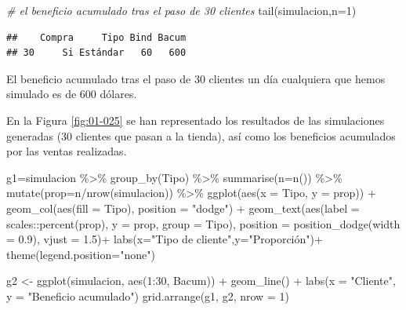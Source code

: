 \documentclass[
]{book}
\newenvironment{Shaded}{\begin{snugshade}}{\end{snugshade}}
\newcommand{\AttributeTok}[1]{\textcolor[rgb]{0.77,0.63,0.00}{#1}}
\newcommand{\CommentTok}[1]{\textcolor[rgb]{0.56,0.35,0.01}{\textit{#1}}}
\newcommand{\DecValTok}[1]{\textcolor[rgb]{0.00,0.00,0.81}{#1}}
\newcommand{\FloatTok}[1]{\textcolor[rgb]{0.00,0.00,0.81}{#1}}
\newcommand{\FunctionTok}[1]{\textcolor[rgb]{0.00,0.00,0.00}{#1}}
\newcommand{\NormalTok}[1]{#1}
\newcommand{\OtherTok}[1]{\textcolor[rgb]{0.56,0.35,0.01}{#1}}
\newcommand{\SpecialCharTok}[1]{\textcolor[rgb]{0.00,0.00,0.00}{#1}}
\newcommand{\StringTok}[1]{\textcolor[rgb]{0.31,0.60,0.02}{#1}}
\theoremstyle{definition}
\theoremstyle{definition}
\theoremstyle{definition}
\theoremstyle{definition}
\theoremstyle{remark}
\begin{document}
\begin{Shaded}
\begin{Highlighting}[]
\CommentTok{\# el beneficio acumulado tras el paso de 30 clientes}
\FunctionTok{tail}\NormalTok{(simulacion,}\AttributeTok{n=}\DecValTok{1}\NormalTok{)}
\end{Highlighting}
\end{Shaded}

\begin{verbatim}
##    Compra     Tipo Bind Bacum
## 30     Si Estándar   60   600
\end{verbatim}

El beneficio acumulado tras el paso de 30 clientes un día cualquiera que hemos simulado es de 600 dólares.

En la Figura \ref{fig:01-025} se han representado los resultados de las simulaciones generadas (30 clientes que pasan a la tienda), así como los beneficios acumulados por las ventas realizadas.

\begin{Shaded}
\begin{Highlighting}[]
\NormalTok{g1}\OtherTok{=}\NormalTok{simulacion }\SpecialCharTok{\%\textgreater{}\%}
  \FunctionTok{group\_by}\NormalTok{(Tipo) }\SpecialCharTok{\%\textgreater{}\%}
  \FunctionTok{summarise}\NormalTok{(}\AttributeTok{n=}\FunctionTok{n}\NormalTok{()) }\SpecialCharTok{\%\textgreater{}\%}
  \FunctionTok{mutate}\NormalTok{(}\AttributeTok{prop=}\NormalTok{n}\SpecialCharTok{/}\FunctionTok{nrow}\NormalTok{(simulacion)) }\SpecialCharTok{\%\textgreater{}\%}
  \FunctionTok{ggplot}\NormalTok{(}\FunctionTok{aes}\NormalTok{(}\AttributeTok{x =}\NormalTok{ Tipo, }\AttributeTok{y =}\NormalTok{ prop)) }\SpecialCharTok{+}
    \FunctionTok{geom\_col}\NormalTok{(}\FunctionTok{aes}\NormalTok{(}\AttributeTok{fill =}\NormalTok{ Tipo), }\AttributeTok{position =} \StringTok{"dodge"}\NormalTok{) }\SpecialCharTok{+}
    \FunctionTok{geom\_text}\NormalTok{(}\FunctionTok{aes}\NormalTok{(}\AttributeTok{label =}\NormalTok{ scales}\SpecialCharTok{::}\FunctionTok{percent}\NormalTok{(prop), }
                  \AttributeTok{y =}\NormalTok{ prop, }\AttributeTok{group =}\NormalTok{ Tipo),}
              \AttributeTok{position =} \FunctionTok{position\_dodge}\NormalTok{(}\AttributeTok{width =} \FloatTok{0.9}\NormalTok{),}
              \AttributeTok{vjust =} \FloatTok{1.5}\NormalTok{)}\SpecialCharTok{+}
  \FunctionTok{labs}\NormalTok{(}\AttributeTok{x=}\StringTok{"Tipo de cliente"}\NormalTok{,}\AttributeTok{y=}\StringTok{"Proporción"}\NormalTok{)}\SpecialCharTok{+}
  \FunctionTok{theme}\NormalTok{(}\AttributeTok{legend.position=}\StringTok{"none"}\NormalTok{)}

\NormalTok{g2 }\OtherTok{\textless{}{-}} \FunctionTok{ggplot}\NormalTok{(simulacion, }\FunctionTok{aes}\NormalTok{(}\DecValTok{1}\SpecialCharTok{:}\DecValTok{30}\NormalTok{, Bacum)) }\SpecialCharTok{+} 
  \FunctionTok{geom\_line}\NormalTok{() }\SpecialCharTok{+}
  \FunctionTok{labs}\NormalTok{(}\AttributeTok{x =} \StringTok{"Cliente"}\NormalTok{, }\AttributeTok{y =} \StringTok{"Beneficio acumulado"}\NormalTok{)}
\FunctionTok{grid.arrange}\NormalTok{(g1, g2, }\AttributeTok{nrow =} \DecValTok{1}\NormalTok{)}
\end{Highlighting}
\end{Shaded}
\end{document}
